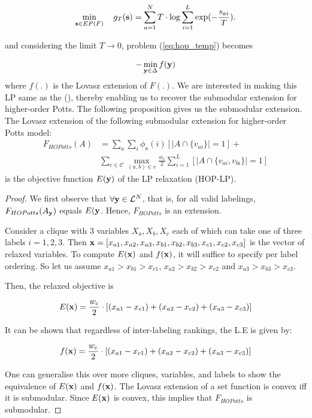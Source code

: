 \begin{equation}
    \min_{{\bf s} \in EP(F)} \quad g_T ({\bf s}) = \sum_{a = 1}^{N} T \cdot \log \sum_{i = 1}^L \exp(-\frac{s_{ai}}{T}).
\label{eq:hop_temp}
\end{equation}

and considering the limit $T \to 0$, problem (\ref{eq:hop_temp}) becomes

\begin{align}
    - \min_{{\bf y} \in \Delta} f({\bf y}) 
\end{align}
where $f(.)$ is the Lovasz extension of $F(.)$. We are interested in making
this LP same as the (), thereby enabling us to recover the submodular extension
for higher-order Potts. The following proposition gives us the submodular
extension.
{\proposition The Lovasz extension of the following submodular extension for
  higher-order Potts model:
  \begin{align}
      F_{HOPotts}(A) &= \sum_a \sum_i \phi_{a}(i) [|A \cap \{v_{ai}\}| = 1] + \nonumber \\
        &\sum_{c \in {\mathcal C}} \max_{(a, b) \in c} \frac{w_c}{2} \sum_{i = 1}^L [|A \cap \{v_{ai}, v_{bi}\}| = 1]
\end{align}
is the objective function $E({\bf y})$ of the LP relaxation (HOP-LP).
\label{proposition:hop_extension}}
\begin{proof}
  We first observe that $\forall {\bf y} \in {\mathcal L}^N$, that is, for all
  valid labelings, $F_{HOPotts}(A_{\bf y})$ equals $E({\bf y}$.  Hence, $F_{HOPotts}$
    is an extension. 

Consider a clique with 3 variables $X_a, X_b, X_c$
each of which can take one of three labels $i = 1, 2, 3$. Then ${\bf x}
= [x_{a1}, x_{a2},x_{a3},x_{b1},x_{b2},x_{b3},x_{c1},x_{c2},x_{c3}]$ is the
vector of relaxed variables. To compute $E({\bf x})$ and $f({\bf x})$, it will
suffice to specify per label ordering. So let us assume $x_{a1} > x_{b1}
> x_{c1}$, $x_{a2} > x_{b2} > x_{c2}$ and $x_{a3} > x_{b3} > x_{c3}$.

Then, the relaxed objective is

\begin{equation}
  E({\bf x}) = \frac{w_c}{2} \cdot [(x_{a1} - x_{c1}) + (x_{a2} - x_{c2}) +(x_{a3} - x_{c3})  ]
\end{equation}

It can be shown that regardless of inter-labeling rankings, the L.E is given
by:

\begin{equation}
  f({\bf x}) = \frac{w_c}{2} \cdot [(x_{a1} - x_{c1}) + (x_{a2} - x_{c2}) +(x_{a3} - x_{c3})  ]
\end{equation}

One can generalise this over more cliques, variables, and labels to show the equivalence of $E({\bf x})$ and $f({\bf x})$.
The Lovasz extension of a set function is convex iff it is submodular. Since $E({\bf x})$
is convex, this implies that $F_{HOPotts}$ is submodular. 
\end{proof}

